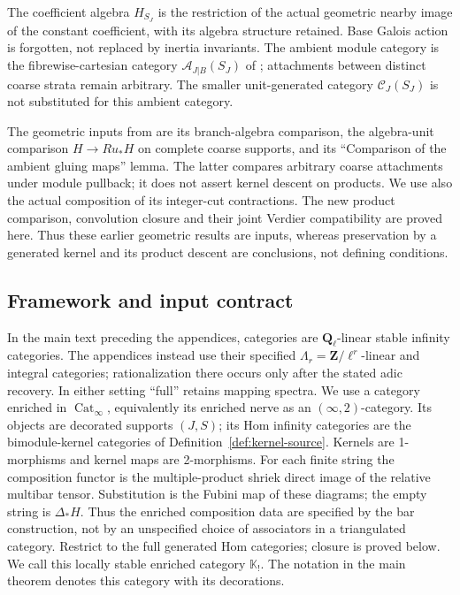 \documentclass[11pt]{article}
\theoremstyle{definition}
\theoremstyle{remark}
\newcommand{\Q}{\mathbf Q_\ell}
\begin{document}
The coefficient algebra $H_{S_J}$ is the restriction of the actual
geometric nearby image of the constant coefficient, with its algebra
structure retained.  Base Galois action is forgotten, not replaced by
inertia invariants.  The ambient module category is the
fibrewise-cartesian category $\mathcal A_{J|B}(S_J)$ of
\cite{Refinement}; attachments between distinct coarse strata remain
arbitrary.  The smaller unit-generated category $\mathcal C_J(S_J)$
is not substituted for this ambient category.

The geometric inputs from \cite{Refinement} are its branch-algebra
comparison, the algebra-unit comparison $H\to Ru_*H$ on complete
coarse supports, and its ``Comparison of the ambient gluing maps''
lemma.  The latter compares arbitrary coarse attachments under
module pullback; it does not assert kernel descent on products.
We use also the actual composition of its integer-cut contractions.
The new product comparison, convolution closure and their joint
Verdier compatibility are proved here.  Thus these earlier geometric
results are inputs, whereas preservation by a generated kernel and
its product descent are conclusions, not defining conditions.

\subsection{Framework and input contract}
In the main text preceding the appendices, categories are
$\Q$-linear stable infinity categories.  The appendices instead use
their specified $\Lambda_r=\mathbf Z/\ell^r$-linear and integral
categories; rationalization there occurs only after the stated adic
recovery.  In either setting ``full'' retains mapping spectra.  We use a category enriched in
$\operatorname{Cat}_\infty$, equivalently its enriched nerve as an
$(\infty,2)$-category.  Its objects are decorated supports $(J,S)$;
its Hom infinity categories are the bimodule-kernel categories of
Definition~\ref{def:kernel-source}.  Kernels are 1-morphisms and
kernel maps are 2-morphisms.  For each finite string the composition
functor is the multiple-product shriek direct image of the relative
multibar tensor.  Substitution is the Fubini map of these diagrams;
the empty string is $\Delta_*H$.  Thus the enriched composition data
are specified by the bar construction, not by an unspecified choice
of associators in a triangulated category.  Restrict to the full
generated Hom categories; closure is proved below.  We call this
locally stable enriched category $\mathbb K_!$.  The notation in the
main theorem denotes this category with its decorations.
\end{document}
